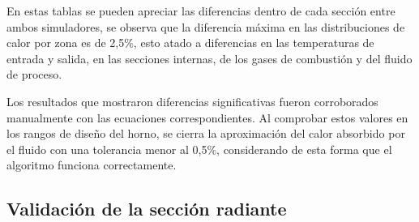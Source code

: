 \par En estas tablas se pueden apreciar las diferencias dentro de cada sección entre ambos simuladores, se observa que la diferencia máxima en las distribuciones de calor por zona es de 2,5\%, esto atado a diferencias en las temperaturas de entrada y salida, en las secciones internas, de los gases de combustión y del fluido de proceso.
\par Los resultados que mostraron diferencias significativas fueron corroborados manualmente con las ecuaciones correspondientes. Al comprobar estos valores en los rangos de diseño del horno, se cierra la aproximación del calor absorbido por el fluido con una tolerancia menor al 0,5\%, considerando de esta forma que el algoritmo funciona correctamente.

\subsection{Validación de la sección radiante}
